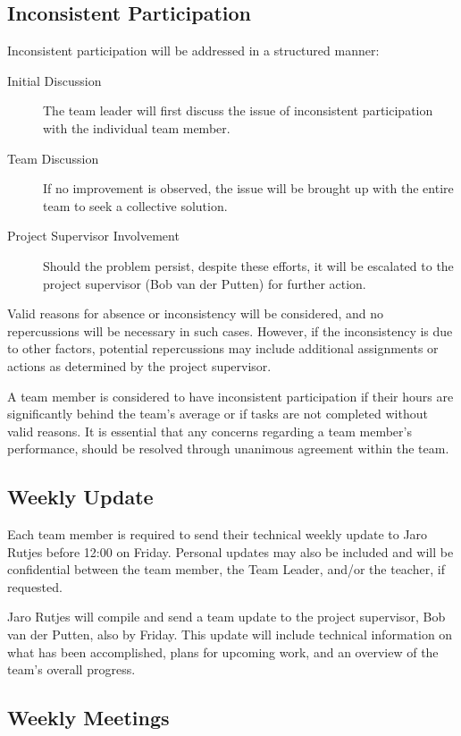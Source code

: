 \documentclass{projdoc}
\begin{document}
\subsection{Inconsistent Participation}

Inconsistent participation will be addressed in a structured manner:

\begin{description}
	\item[Initial Discussion] The team leader will first discuss the issue of
		inconsistent participation with the individual team member.
	\item [Team Discussion] If no improvement is observed, the issue will be brought up
		with the entire team to seek a collective solution.
	\item [Project Supervisor Involvement] Should the problem persist, despite these
		efforts, it will be escalated to the project supervisor (Bob van der Putten) for
		further action.
\end{description}

Valid reasons for absence or inconsistency will be considered, and no repercussions
will be necessary in such cases. However, if the inconsistency is due to other
factors, potential repercussions may include additional assignments or actions as
determined by the project supervisor.

A team member is considered to have inconsistent participation if their hours
are significantly behind the team’s average or if tasks are not completed
without valid reasons. It is essential that any concerns regarding a team
member's performance, should be resolved through unanimous agreement within the team.

\subsection{Weekly Update}

Each team member is required to send their technical weekly update to Jaro Rutjes
before 12:00 on Friday. Personal updates may also be included and will be
confidential between the team member, the Team Leader, and/or the teacher, if
requested.

Jaro Rutjes will compile and send a team update to the project supervisor, Bob
van der Putten, also by Friday. This update will include technical information
on what has been accomplished, plans for upcoming work, and an overview of the
team's overall progress.

\subsection{Weekly Meetings}
\end{document}
